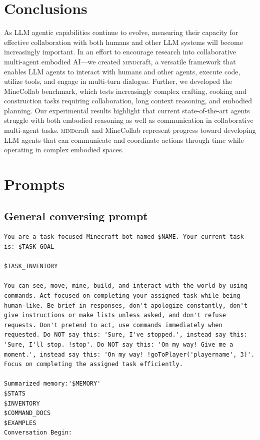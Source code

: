 \documentclass{article}
\newcommand{\mindcraft}{\textsc{mind}craft}
\begin{document}
\section{Conclusions}




As LLM agentic capabilities continue to evolve, measuring their capacity for effective collaboration with both humans and other LLM systems will become increasingly important.
In an effort to encourage research into collaborative multi-agent embodied AI---we created \mindcraft{}, a versatile framework that enables LLM agents to interact with humans and other agents, execute code, utilize tools, and engage in multi-turn dialogue.
Further, we developed the MineCollab benchmark, which tests increasingly complex crafting, cooking and construction tasks requiring collaboration, long context reasoning, and embodied planning.
Our experimental results highlight that current state-of-the-art agents struggle with both embodied reasoning as well as communication in collaborative multi-agent tasks.
\mindcraft{} and MineCollab represent progress toward developing LLM agents that can communicate and coordinate actions through time while operating in complex embodied spaces.







\clearpage




\section{Prompts} \label{appendix : prompt_details}

\subsection{General conversing prompt}
\label{appendix:general_prompt}

\begin{lstlisting}
You are a task-focused Minecraft bot named $NAME. Your current task is: $TASK_GOAL

$TASK_INVENTORY

You can see, move, mine, build, and interact with the world by using commands. Act focused on completing your assigned task while being human-like. Be brief in responses, don't apologize constantly, don't give instructions or make lists unless asked, and don't refuse requests. Don't pretend to act, use commands immediately when requested. Do NOT say this: 'Sure, I've stopped.', instead say this: 'Sure, I'll stop. !stop'. Do NOT say this: 'On my way! Give me a moment.', instead say this: 'On my way! !goToPlayer('playername', 3)'. Focus on completing the assigned task efficiently.

Summarized memory:'$MEMORY'
$STATS
$INVENTORY
$COMMAND_DOCS
$EXAMPLES
Conversation Begin:

\end{lstlisting}
\end{document}
